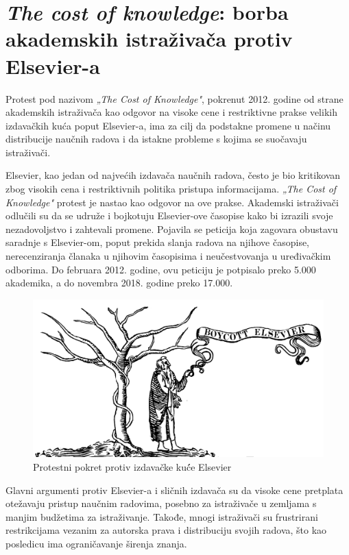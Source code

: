 \documentclass{article}
\begin{document}
\section{\textit{The cost of knowledge}: borba akademskih istraživača protiv Elsevier-a}

Protest pod nazivom \textit{„The Cost of Knowledge"}, pokrenut 2012. godine od strane akademskih istraživača kao odgovor na visoke cene i restriktivne prakse velikih izdavačkih kuća poput Elsevier-a, ima za cilj da podstakne promene u načinu distribucije naučnih radova i da istakne probleme s kojima se suočavaju istraživači.

Elsevier, kao jedan od najvećih izdavača naučnih radova, često je bio kritikovan zbog visokih cena i restriktivnih politika pristupa informacijama. \textit{„The Cost of Knowledge"} protest je nastao kao odgovor na ove prakse. Akademski istraživači odlučili su da se udruže i bojkotuju Elsevier-ove časopise kako bi izrazili svoje nezadovoljstvo i zahtevali promene. Pojavila se peticija koja zagovara obustavu saradnje s Elsevier-om, poput prekida slanja radova na njihove časopise, nerecenziranja članaka u njihovim časopisima i neučestvovanja u uređivačkim odborima. Do februara 2012. godine, ovu peticiju je potpisalo preko 5.000 akademika, a do novembra 2018. godine preko 17.000\cite{an2024cost}.

\begin{figure}[htbp]
    \center
    \includegraphics[scale=0.1]{img/Boycott_Elsevier.png}
    \caption{Protestni pokret protiv izdavačke kuć́e Elsevier}
\end{figure}

Glavni argumenti protiv Elsevier-a i sličnih izdavača su da visoke cene pretplata otežavaju pristup naučnim radovima, posebno za istraživače u zemljama s manjim budžetima za istraživanje. Takođe, mnogi istraživači su frustrirani restrikcijama vezanim za autorska prava i distribuciju svojih radova, što kao posledicu ima ograničavanje širenja znanja.
\end{document}

